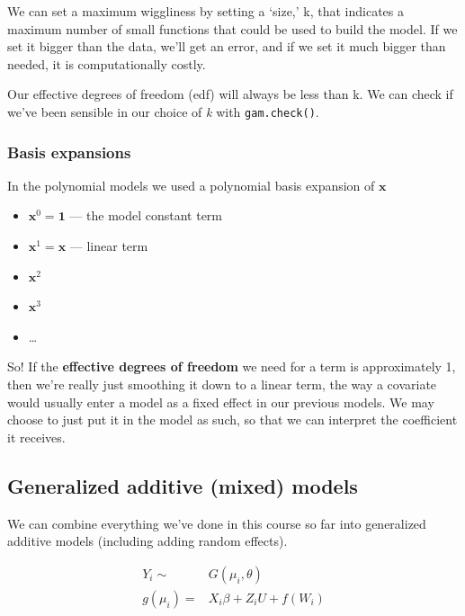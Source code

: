 \documentclass[
  openany]{book}
\providecommand{\tightlist}{%
  \setlength{\itemsep}{0pt}\setlength{\parskip}{0pt}}
\begin{document}
We can set a maximum wiggliness by setting a `size,' k, that indicates a maximum number of small functions that could be used to build the model. If we set it bigger than the data, we'll get an error, and if we set it much bigger than needed, it is computationally costly.

Our effective degrees of freedom (edf) will always be less than k. We can check if we've been sensible in our choice of \emph{k} with \texttt{gam.check()}.

\hypertarget{basis-expansions}{%
\subsubsection{Basis expansions}\label{basis-expansions}}

In the polynomial models we used a polynomial basis expansion of \(\boldsymbol{x}\)

\begin{itemize}
\tightlist
\item
  \(\boldsymbol{x}^0 = \boldsymbol{1}\) --- the model constant term
\item
  \(\boldsymbol{x}^1 = \boldsymbol{x}\) --- linear term
\item
  \(\boldsymbol{x}^2\)
\item
  \(\boldsymbol{x}^3\)
\item
  \ldots{}
\end{itemize}

So! If the \textbf{effective degrees of freedom} we need for a term is approximately 1, then we're really just smoothing it down to a linear term, the way a covariate would usually enter a model as a fixed effect in our previous models. We may choose to just put it in the model as such, so that we can interpret the coefficient it receives.

\hypertarget{generalized-additive-mixed-models}{%
\subsection{Generalized additive (mixed) models}\label{generalized-additive-mixed-models}}

We can combine everything we've done in this course so far into generalized additive models (including adding random effects).

\begin{align*}
Y_i \sim & G(\mu_i, \theta)\\
g(\mu_i) = & X_i \beta + Z_iU + f(W_i)
\end{align*}
\end{document}
